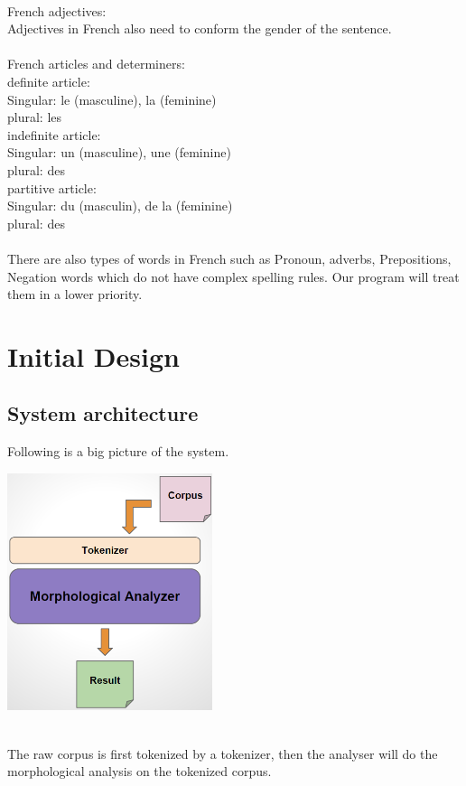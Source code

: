 \documentclass[11pt,letterpaper]{article}
\begin{document}
\\
French adjectives:\\
Adjectives in French also need to conform the gender of the sentence.\\
\\
French articles and determiners:\\
\indent definite article:\\
\indent\indent Singular: le (masculine), la (feminine)\\
\indent\indent plural: les\\
\indent indefinite article:\\
\indent\indent Singular: un (masculine), une (feminine)\\
\indent\indent plural: des\\
\indent partitive article:\\
\indent\indent Singular: du (masculin), de la (feminine)\\
\indent\indent plural: des\\
\\
There are also types of words in French such as Pronoun, adverbs, Prepositions, Negation words which do not have complex spelling rules. Our program will treat them in a lower priority.

\section{Initial Design}
\subsection*{System architecture}
Following is a big picture of the system.\\
\centerline{\includegraphics[width=60mm]{img/overview.png}}\\
The raw corpus is first tokenized by a tokenizer, then the analyser will do the morphological analysis on the tokenized corpus.\\
\end{document}
